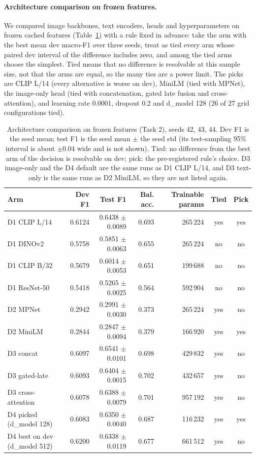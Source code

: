 \paragraph{Architecture comparison on frozen features.}
We compared image backbones, text encoders, heads and hyperparameters on frozen cached features (Table~\ref{tab:h_arch}) with a rule fixed in advance: take the arm with the best mean dev macro-F1 over three seeds, treat as tied every arm whose paired dev interval of the difference includes zero, and among the tied arms choose the simplest.
Tied means that no difference is resolvable at this sample size, not that the arms are equal, so the many ties are a power limit.
The picks are CLIP L/14 (every alternative is worse on dev), MiniLM (tied with MPNet), the image-only head (tied with concatenation, gated late fusion and cross-attention), and learning rate 0.0001, dropout 0.2 and d_model 128 (26 of 27 grid configurations tied).
\begin{table}[t]
\centering
\footnotesize
\caption{Architecture comparison on frozen features (Task 2), seeds 42, 43, 44. Dev F1 is the seed mean; test F1 is the seed mean $\pm$ the seed std (its test-sampling 95\% interval is about $\pm 0.04$ wide and is not shown). Tied: no difference from the best arm of the decision is resolvable on dev; pick: the pre-registered rule's choice. D3 image-only and the D4 default are the same runs as D1 CLIP L/14, and D3 text-only is the same runs as D2 MiniLM, so they are not listed again.}
\label{tab:h_arch}
\begin{tabular}{lrrrrcc}
\toprule
Arm & Dev F1 & Test F1 & Bal. acc. & Trainable params & Tied & Pick \\
\midrule
D1 CLIP L/14 & 0.6124 & 0.6438 $\pm$ 0.0089 & 0.693 & 265\,224 & yes & yes \\
D1 DINOv2 & 0.5758 & 0.5851 $\pm$ 0.0063 & 0.655 & 265\,224 & no & no \\
D1 CLIP B/32 & 0.5679 & 0.6014 $\pm$ 0.0053 & 0.651 & 199\,688 & no & no \\
D1 ResNet-50 & 0.5418 & 0.5265 $\pm$ 0.0025 & 0.564 & 592\,904 & no & no \\
D2 MPNet & 0.2942 & 0.2991 $\pm$ 0.0030 & 0.373 & 265\,224 & yes & no \\
D2 MiniLM & 0.2844 & 0.2847 $\pm$ 0.0094 & 0.379 & 166\,920 & yes & yes \\
D3 concat & 0.6097 & 0.6541 $\pm$ 0.0101 & 0.698 & 429\,832 & yes & no \\
D3 gated-late & 0.6093 & 0.6404 $\pm$ 0.0015 & 0.702 & 432\,657 & yes & no \\
D3 cross-attention & 0.6078 & 0.6388 $\pm$ 0.0079 & 0.701 & 957\,192 & yes & no \\
D4 picked (d\_model 128) & 0.6083 & 0.6350 $\pm$ 0.0040 & 0.687 & 116\,232 & yes & yes \\
D4 best on dev (d\_model 512) & 0.6200 & 0.6338 $\pm$ 0.0119 & 0.677 & 661\,512 & yes & no \\
\bottomrule
\end{tabular}
\end{table}
